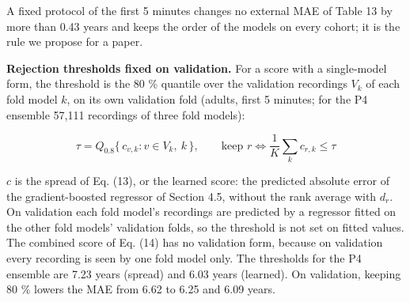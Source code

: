 \documentclass[11pt,a4paper]{article}
\begin{document}
A fixed protocol of the first 5 minutes changes no external MAE of Table 13 by more than 0.43 years and keeps the order of the models on every cohort; it is the rule we propose for a paper.

\textbf{Rejection thresholds fixed on validation.} For a score with a single-model form, the threshold is the 80 \% quantile over the validation recordings $V_k$ of each fold model $k$, on its own validation fold (adults, first 5 minutes; for the P4 ensemble 57,111 recordings of three fold models):

\begin{equation}
\tau = Q_{0.8}\big\{\, c_{v,k} : v \in V_k,\ k \,\big\}, \qquad \text{keep } r \Leftrightarrow \frac{1}{K}\sum_{k} c_{r,k} \le \tau \tag{36}
\end{equation}

$c$ is the spread of Eq. (13), or the learned score: the predicted absolute error of the gradient-boosted regressor of Section 4.5, without the rank average with $d_r$. On validation each fold model's recordings are predicted by a regressor fitted on the other fold models' validation folds, so the threshold is not set on fitted values. The combined score of Eq. (14) has no validation form, because on validation every recording is seen by one fold model only. The thresholds for the P4 ensemble are 7.23 years (spread) and 6.03 years (learned). On validation, keeping 80 \% lowers the MAE from 6.62 to 6.25 and 6.09 years.

\begin{table}[t]
\centering
\small
\caption{P4 ensemble, first 5 minutes: MAE in years of the kept units, with the share kept, under each rule of Eq. (36) and under the cohort's own 80 \% quantile of the same score.}
\end{table}
\end{document}

